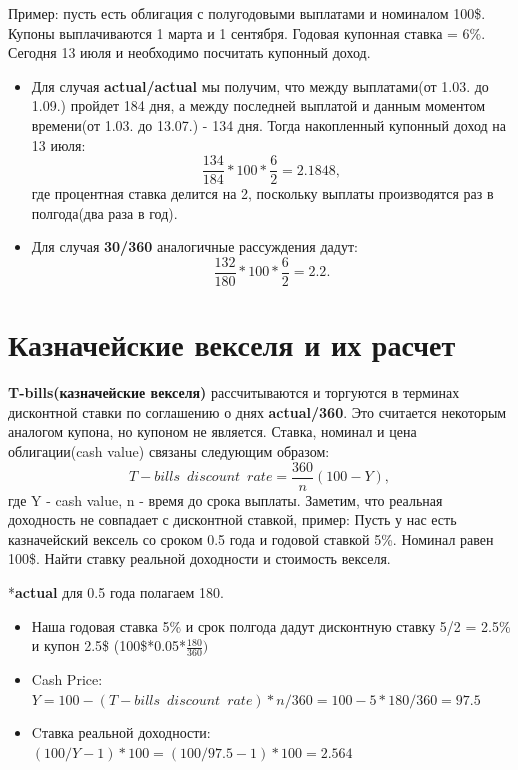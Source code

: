 \documentclass{article}
\begin{document}
Пример: пусть есть облигация с полугодовыми выплатами и номиналом 100\$. Купоны выплачиваются 1 марта и 1 сентября. Годовая купонная ставка = 6\%. Сегодня 13 июля и необходимо посчитать купонный доход.
\begin{itemize}
    \item Для случая \textbf{actual/actual} мы получим, что между выплатами(от 1.03. до 1.09.) пройдет 184 дня, а между последней выплатой и данным моментом времени(от 1.03. до 13.07.) - 134 дня. Тогда накопленный купонный доход на 13 июля:
    $$\frac{134}{184}*100*\frac{6}{2} = 2.1848,$$ где процентная ставка делится на 2, поскольку выплаты производятся раз в полгода(два раза в год).
    \item Для случая \textbf{30/360} аналогичные рассуждения дадут:
     $$\frac{132}{180}*100*\frac{6}{2} = 2.2.$$
\end{itemize}
 

\section{Казначейские векселя и их расчет}

\textbf{T-bills(казначейские векселя)} рассчитываются и торгуются в терминах дисконтной ставки по соглашению о днях \textbf{actual/360}. Это считается некоторым аналогом купона, но купоном не является. Ставка, номинал и цена облигации(cash value) связаны следующим образом:
$$T-bills \enspace discount \enspace rate = \frac{360}{n} (100 - Y),$$ где Y - cash value, n - время до срока выплаты.
Заметим, что реальная доходность не совпадает с дисконтной ставкой, пример:
Пусть у нас есть казначейский вексель со сроком 0.5 года и годовой ставкой 5\%. Номинал равен 100\$. Найти ставку реальной доходности и стоимость векселя.


*\textbf{actual} для 0.5 года полагаем 180.

\begin{itemize}
    \item Наша годовая ставка 5\% и срок полгода дадут дисконтную ставку 5/2 = 2.5\% и купон 2.5\$ (100\$*0.05*$\frac{180}{360})$
    \item Cash Price: $Y = 100 - (T-bills \enspace discount \enspace rate)*n/360 = 100 - 5*180/360 = 97.5$
    \item Cтавка реальной доходности: $(100/Y - 1)*100 = (100/97.5 - 1)*100 =   2.564$
\end{itemize}
\end{document}
